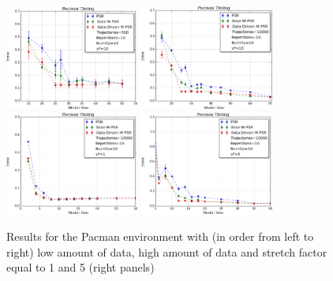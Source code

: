 \documentclass[letterpaper]{article}
\begin{document}
\begin{figure}[ht!]
\includegraphics[width=44mm]{Pacman500.png}%
\includegraphics[width=44mm]{Pacman10k.png}%
\includegraphics[width=44mm]{PacmanSF-1.png}%
\includegraphics[width=44mm]{PacmanSF-5.png}%
\caption{Results for the Pacman environment with (in order from left to right) low amount of data, high amount of data and stretch factor equal to 1 and 5 (right panels)\label{fig-pacsf5}%
}
\end{figure}
\end{document}
